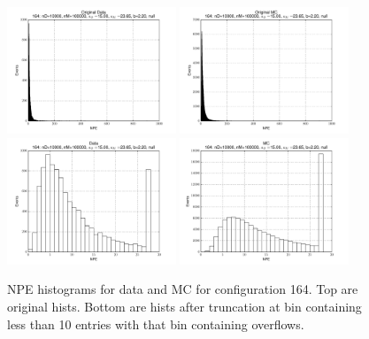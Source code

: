  \begin{figure}[htbp] \begin{center} 
\includegraphics[width=0.45\textwidth]{../FIGURES/164/FIG_Original_Data.pdf} 
\includegraphics[width=0.45\textwidth]{../FIGURES/164/FIG_Original_MC.pdf} 
\includegraphics[width=0.45\textwidth]{../FIGURES/164/FIG_Data.pdf} 
\includegraphics[width=0.45\textwidth]{../FIGURES/164/FIG_MC.pdf} 
\caption{NPE histograms for data and MC for configuration 164. Top are original hists. Bottom are hists after truncation at bin containing less than 10 entries with that bin containing overflows.} 
\label{tab:npe_164} 
\end{center} \end{figure} 
\clearpage
 